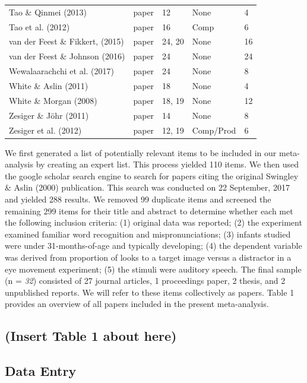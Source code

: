 \documentclass[man]{apa6}
\newenvironment{lltable}{\begin{landscape}\begin{center}\begin{ThreePartTable}}{\end{ThreePartTable}\end{center}\end{landscape}}
\theoremstyle{definition}
\theoremstyle{definition}
\theoremstyle{definition}
\theoremstyle{remark}
\begin{document}
\begin{lltable}
\begin{longtable}{lllll}
Tao \& Qinmei (2013) & paper & 12 & None & 4\\
Tao et al. (2012) & paper & 16 & Comp & 6\\
van der Feest \& Fikkert, (2015) & paper & 24, 20 & None & 16\\
van der Feest \& Johnson (2016) & paper & 24 & None & 24\\
Wewalaarachchi et al. (2017) & paper & 24 & None & 8\\
White \& Aslin (2011) & paper & 18 & None & 4\\
White \& Morgan (2008) & paper & 18, 19 & None & 12\\
Zesiger \& Jöhr (2011) & paper & 14 & None & 8\\
Zesiger et al. (2012) & paper & 12, 19 & Comp/Prod & 6\\
\bottomrule
\end{longtable}
\end{lltable}

We first generated a list of potentially relevant items to be included
in our meta-analysis by creating an expert list. This process yielded
110 items. We then used the google scholar search engine to search for
papers citing the original Swingley \& Aslin (2000) publication. This
search was conducted on 22 September, 2017 and yielded 288 results. We
removed 99 duplicate items and screened the remaining 299 items for
their title and abstract to determine whether each met the following
inclusion criteria: (1) original data was reported; (2) the experiment
examined familiar word recognition and mispronunciations; (3) infants
studied were under 31-months-of-age and typically developing; (4) the
dependent variable was derived from proportion of looks to a target
image versus a distractor in a eye movement experiment; (5) the stimuli
were auditory speech. The final sample (n = \emph{32}) consisted of 27
journal articles, 1 proceedings paper, 2 thesis, and 2 unpublished
reports. We will refer to these items collectively as papers. Table 1
provides an overview of all papers included in the present
meta-analysis.

\subsection{(Insert Table 1 about
here)}\label{insert-table-1-about-here}

\subsection{Data Entry}\label{data-entry}
\end{document}
